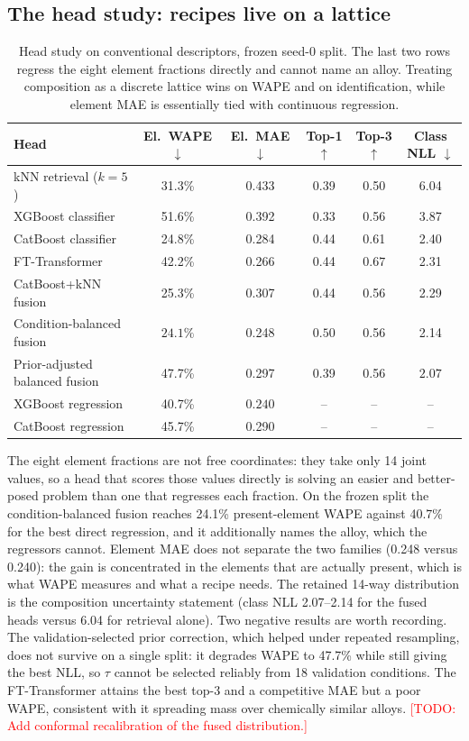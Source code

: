 \documentclass{article}
\newcommand{\todo}[1]{\textcolor{red}{[TODO: #1]}}
\begin{document}
\subsection{The head study: recipes live on a lattice}
\begin{table}[t]
  \caption{Head study on conventional descriptors, frozen seed-0 split.
  The last two rows regress the eight element fractions directly and cannot
  name an alloy. Treating composition as a discrete lattice wins on WAPE and
  on identification, while element MAE is essentially tied with continuous
  regression.}
  \label{tab:heads}
  \centering
  \begin{tabular}{lccccc}
    \toprule
    Head & El.\ WAPE $\downarrow$ & El.\ MAE $\downarrow$ &
    Top-1 $\uparrow$ & Top-3 $\uparrow$ & Class NLL $\downarrow$ \\
    \midrule
    kNN retrieval ($k{=}5$)  & 31.3\% & 0.433 & 0.39 & 0.50 & 6.04 \\
    XGBoost classifier       & 51.6\% & 0.392 & 0.33 & 0.56 & 3.87 \\
    CatBoost classifier      & 24.8\% & 0.284 & 0.44 & 0.61 & 2.40 \\
    FT-Transformer           & 42.2\% & 0.266 & 0.44 &
    $\mathbf{0.67}$ & 2.31 \\
    CatBoost{+}kNN fusion    & 25.3\% & 0.307 & 0.44 & 0.56 & 2.29 \\
    Condition-balanced fusion & $\mathbf{24.1\%}$ & 0.248 &
    $\mathbf{0.50}$ & 0.56 & 2.14 \\
    Prior-adjusted balanced fusion & 47.7\% & 0.297 & 0.39 & 0.56 &
    $\mathbf{2.07}$ \\
    XGBoost regression       & 40.7\% & $\mathbf{0.240}$ & -- & -- & -- \\
    CatBoost regression      & 45.7\% & 0.290 & -- & -- & -- \\
    \bottomrule
  \end{tabular}
\end{table}
The eight element fractions are not free coordinates: they take only 14 joint
values, so a head that scores those values directly is solving an easier and
better-posed problem than one that regresses each fraction. On the frozen
split the condition-balanced fusion reaches 24.1\% present-element WAPE
against 40.7\% for the best direct regression, and it additionally names the
alloy, which the regressors cannot. Element MAE does not separate the two
families (0.248 versus 0.240): the gain is concentrated in the elements that
are actually present, which is what WAPE measures and what a recipe needs.
The retained 14-way distribution is the composition uncertainty statement
(class NLL 2.07--2.14 for the fused heads versus 6.04 for retrieval alone).
Two negative results are worth recording. The validation-selected prior
correction, which helped under repeated resampling, does not survive on a
single split: it degrades WAPE to 47.7\% while still giving the best NLL, so
$\tau$ cannot be selected reliably from 18 validation conditions. The
FT-Transformer attains the best top-3 and a competitive MAE but a poor WAPE,
consistent with it spreading mass over chemically similar alloys.
\todo{Add conformal recalibration of the fused distribution.}
\end{document}
